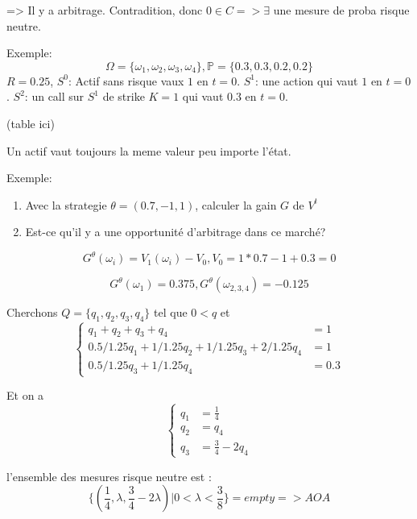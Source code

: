 \documentclass{article}
\begin{document}
=> Il y a arbitrage. Contradition, donc $0\in C => \exists $ une mesure de proba risque neutre.

Exemple:
\begin{equation}
\Omega=\{\omega_1, \omega_2,\omega_3, \omega_4\}, \mathbb{P}=\{0.3, 0.3,0.2,0.2\}
\end{equation}
$R=0.25$, $S^0$: Actif sans risque vaux $1$ en $t=0$.
$S^1$: une action qui vaut $1$ en $t=0$.
$S^2$: un call sur $S^1$ de strike $K=1$ qui vaut $0.3$ en $t=0$.

(table ici)

Un actif vaut toujours la meme valeur peu importe l'\'etat.

Exemple:
\begin{enumerate}
	\item Avec la strategie $\theta=(0.7, -1, 1)$, calculer la gain $G$ de $V^t$
	\item Est-ce qu'il y a une opportunit\'e d'arbitrage dans ce march\'e?
\end{enumerate}

\begin{equation}
G^\theta(\omega_i)=V_1(\omega_i)-V_0, V_0=1*0.7-1+0.3=0
\end{equation}

\begin{equation}
G^\theta(\omega_1)=0.375, G^\theta(\omega_{2,3,4})=-0.125
\end{equation}

Cherchons $Q=\{q_1,q_2,q_3,q_4\}$ tel que $0<q$ et
\begin{equation}
\left\{ \begin{array}{rcl}
	q_1+q_2+q_3+q_4 &= 1 \\
	0.5/1.25 q_1+1/1.25 q_2+1/1.25 q_3 + 2/1.25 q_4 &= 1 \\
	0.5/1.25 q_3 + 1/1.25 q_4 &=0.3
\end{array}\right.
\end{equation}

Et on a
\begin{equation}
\left\{ \begin{array}{rcl}
q_1&=\frac{1}{4} \\
q_2&=q_4 \\ 
q_3&=\frac{3}{4}-2q_4
\end{array}\right.
\end{equation}

l'ensemble des mesures risque neutre est :
\begin{equation}
\{(\frac{1}{4},\lambda,\frac{3}{4}-2\lambda)|0<\lambda<\frac{3}{8}\}=empty => AOA
\end{equation}
\end{document}
